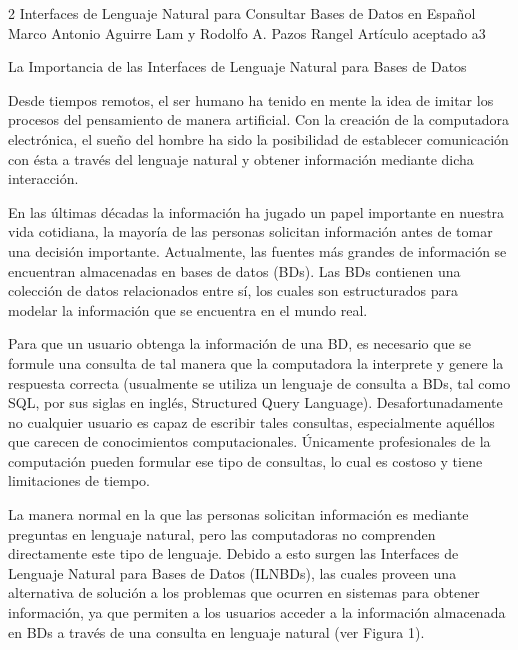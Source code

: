 \documentclass[letterpaper,10pt,final,hyphenatedtitles]{papertexKS}
\author{}
\title{}
\begin{document}
\newpage




\begin{news}{2}
        {Interfaces de Lenguaje Natural para Consultar Bases de Datos en Español}
        {\textcolor{color}{Marco Antonio Aguirre Lam} y \textcolor{color}{Rodolfo A. Pazos Rangel}}
        {Artículo aceptado}
        {a3}

\noindent\textcolor{color}{\Large{La Importancia de las Interfaces de Lenguaje Natural para Bases de Datos}}

Desde tiempos remotos, el ser humano ha tenido en mente la idea de imitar los procesos del pensamiento de manera artificial. Con la creación de la computadora electrónica, el sueño del hombre ha sido la posibilidad de establecer comunicación con ésta a través del lenguaje natural y obtener información mediante dicha interacción.

En las últimas décadas la información ha jugado un papel importante en nuestra vida cotidiana, la mayoría de las personas solicitan información antes de tomar una decisión importante. Actualmente, las fuentes más grandes de información se encuentran almacenadas en bases de datos (BDs). Las BDs contienen una colección de datos relacionados entre sí, los cuales son estructurados para modelar la información que se encuentra en el mundo real.

Para que un usuario obtenga la información de una BD, es necesario que se formule una consulta de tal manera que la computadora la interprete y genere la respuesta correcta (usualmente se utiliza un lenguaje de consulta a BDs, tal como SQL, por sus siglas en inglés, Structured Query Language).   Desafortunadamente no cualquier usuario es capaz de escribir tales consultas, especialmente aquéllos que carecen de conocimientos computacionales. Únicamente profesionales de la computación pueden formular ese tipo de consultas, lo cual es costoso y tiene limitaciones de tiempo.
	
La manera normal en la que las personas solicitan información es mediante preguntas en lenguaje natural, pero las computadoras no comprenden directamente este tipo de lenguaje. Debido a esto surgen las Interfaces de Lenguaje Natural para Bases de Datos (ILNBDs), las cuales proveen una alternativa de solución a los problemas que ocurren en sistemas para obtener información, ya que permiten a los usuarios acceder a la información almacenada en BDs a través de una consulta en lenguaje natural (ver Figura 1).


\end{news}
\end{document}
